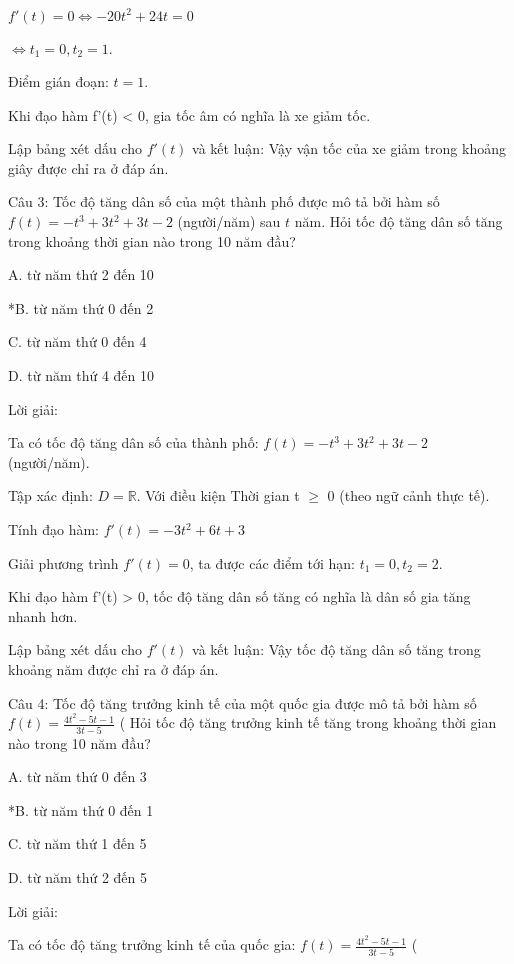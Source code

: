 \documentclass[a4paper,12pt]{article}
\begin{document}
\(f'(t) = 0 \Leftrightarrow -20t^2+24t = 0\)

\(\Leftrightarrow t_1 = 0, t_2 = 1\).

Điểm gián đoạn: \(t = 1\).

Khi đạo hàm f'(t) < 0, gia tốc âm có nghĩa là xe giảm tốc.

Lập bảng xét dấu cho \(f'(t)\) và kết luận: Vậy vận tốc của xe giảm trong khoảng giây được chỉ ra ở đáp án.



Câu 3: Tốc độ tăng dân số của một thành phố được mô tả bởi hàm số \(f(t) = -t^{3}+ 3t^{2}+ 3t- 2\) (người/năm) sau \(t\) năm. 
            Hỏi tốc độ tăng dân số tăng trong khoảng thời gian nào trong 10 năm đầu?

A. từ năm thứ 2 đến 10

*B. từ năm thứ 0 đến 2

C. từ năm thứ 0 đến 4

D. từ năm thứ 4 đến 10

Lời giải:

Ta có tốc độ tăng dân số của thành phố: \(f(t) = -t^{3}+ 3t^{2}+ 3t- 2\) (người/năm).

Tập xác định: \(D = \mathbb{R}\).
Với điều kiện Thời gian t $\geq$ 0 (theo ngữ cảnh thực tế).

Tính đạo hàm:
\(f'(t) = -3t^{2}+ 6t+ 3\)

Giải phương trình \(f'(t) = 0\), ta được các điểm tới hạn:
\(t_1 = 0, t_2 = 2\).



Khi đạo hàm f'(t) > 0, tốc độ tăng dân số tăng có nghĩa là dân số gia tăng nhanh hơn.

Lập bảng xét dấu cho \(f'(t)\) và kết luận: Vậy tốc độ tăng dân số tăng trong khoảng năm được chỉ ra ở đáp án.



Câu 4: Tốc độ tăng trưởng kinh tế của một quốc gia được mô tả bởi hàm số \(f(t) = \frac{4t^2-5t-1}{3t-5}\) (%
            Hỏi tốc độ tăng trưởng kinh tế tăng trong khoảng thời gian nào trong 10 năm đầu?

A. từ năm thứ 0 đến 3

*B. từ năm thứ 0 đến 1

C. từ năm thứ 1 đến 5

D. từ năm thứ 2 đến 5

Lời giải:

Ta có tốc độ tăng trưởng kinh tế của quốc gia: \(f(t) = \frac{4t^2-5t-1}{3t-5}\) (%
\end{document}
